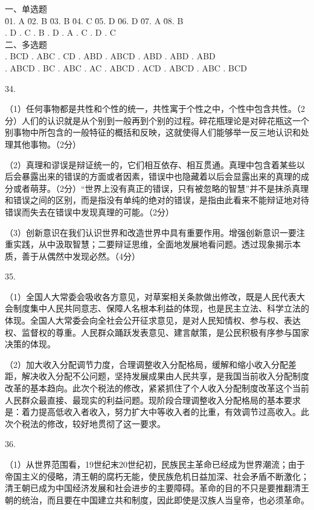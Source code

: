 \documentclass[a4paper]{article}
\begin{document}
\begin{tabbing}
一、单选题\\
\= 01. A \qquad \= 02. B \qquad \= 03. B \qquad \= 04. C \qquad \= 05. D \qquad \= 06. D \qquad \= 07. A \qquad \= 08. B \qquad \=\\
. D . C . B . D . A . C . D . C \\
二、多选题\\
. BCD  . ABC  . CD   . ABD  . ABCD . ABD  . ABD  . ABD  \\
. ABCD . BC   . ABC  . AC   . ABCD . ACD  . ABCD . ABC  . BCD
\end{tabbing}

34.

（1）任何事物都是共性和个性的统一，共性寓于个性之中，个性中包含共性。（2分）人们的认识就是从个别到一般再到个别的过程。碎花瓶理论是对碎花瓶这一个别事物中所包含的一般特征的概括和反映，这就使得人们能够举一反三地认识和处理其他事物。（2分）

（2）真理和谬误是辩证统一的，它们相互依存、相互贯通。真理中包含着某些以后会暴露出来的错误的方面或者因素，错误中也隐藏着以后会显露出来的真理的成分或者萌芽。（2分）“世界上没有真正的错误，只有被忽略的智慧”并不是抹杀真理和错误之间的区别，而是指没有单纯的绝对的错误，是指由此看来不能辩证地对待错误而失去在错误中发现真理的可能。（2分）

（3）创新意识在我们认识世界和改造世界中具有重要作用。增强创新意识一要注重实践，从中汲取智慧；二要辩证思维，全面地发展地看问题。透过现象揭示本质，善于从偶然中发现必然。（4分）

35.

（1）全国人大常委会吸收各方意见，对草案相关条款做出修改，既是人民代表大会制度集中人民共同意志、保障人名根本利益的体现，也是民主立法、科学立法的体现。全国人大常委会向全社会公开征求意见，是对人民知情权、参与权、表达权、监督权的尊重。人民群众踊跃发表意见、建言献策，是公民积极有序参与国家决策的体现。

（2）加大收入分配调节力度，合理调整收入分配格局，缓解和缩小收入分配差距，解决收入分配不公问题，坚持发展成果由人民共享，是我国当前收入分配制度改革的基本趋向。此次个税法的修改，紧紧抓住了个人收入分配制度改革这个当前人民群众最直接、最现实的利益问题。现阶段合理调整收入分配格局的基本要求是：着力提高低收入者收入，努力扩大中等收入者的比重，有效调节过高收入。此次个税法的修改，较好地贯彻了这一要求。

36.

（1）从世界范围看，19世纪末20世纪初，民族民主革命已经成为世界潮流；由于帝国主义的侵略，清王朝的腐朽无能，使民族危机日益加深、社会矛盾不断激化；清王朝已成为中国经济发展和社会进步的主要障碍。革命的目的不只是要推翻清王朝的统治，而且要在中国建立共和制度，因此即使是汉族人当皇帝，也必须革命。
\end{document}
